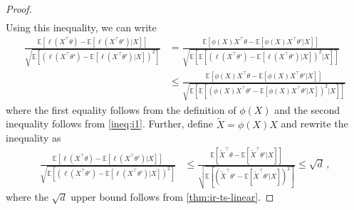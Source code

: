 \documentclass[letter, 12pt]{report}
\newcommand{\E}{\mathbb E}
\newcommand{\1}{\mathbf{1}}
\theoremstyle{plain}
\theoremstyle{definition}
\theoremstyle{remark}
\begin{document}
\begin{proof}
\begin{align}
    \end{align}
    Using this inequality, we can write
    \begin{align*}
        \frac{
            \E\left[
                \ell(X^\top \theta) - \E[\ell(X^\top \theta')|X]
                \right]
        }{
            \sqrt{
                \E\left[
                    \left(\ell(X^\top \theta') - \E[\ell(X^\top \theta')|X]\right)^2
                    \right]
            }
        }
         & =
        \frac{
            \E\left[
                \phi(X)X^\top \theta - \E[\phi(X)X^\top \theta'|X]
                \right]
        }{
            \sqrt{
                \E\left[
                    \E\left[
                        \left(\ell(X^\top \theta') - \E[\ell(X^\top \theta')|X]\right)^2
                        |X
                        \right]
                    \right]
            }
        }
        \\
         & \leq
        \frac{
            \E\left[
                \phi(X)X^\top \theta - \E[\phi(X)X^\top \theta'|X]
                \right]
        }{
            \sqrt{
                \E\left[
                    \E\left[
                        \left(\phi(X)X^\top \theta' -
                        \E[\phi(X)X^\top \theta'|X]\right)^2
                        |X
                        \right]
                    \right]
            }
        }
    \end{align*}
    where the first equality follows from the
    definition of $\phi(X)$ and the second inequality follows from \ref{ineq:i1}.
    Further, define $\tilde{X} = \phi(X)X$ and
    rewrite the inequality as
    \begin{align*}
        \frac{
            \E\left[
                \ell(X^\top \theta) - \E[\ell(X^\top \theta')|X]
                \right]
        }{
            \sqrt{
                \E\left[
                    \left(\ell(X^\top \theta') - \E[\ell(X^\top \theta')|X]\right)^2
                    \right]
            }
        }
         & \leq
        \frac{
            \E\left[
                \tilde{X}^\top \theta - \E[\tilde{X}^\top \theta'|X]
                \right]
        }{
            \sqrt{
                \E\left[
                    \left(\tilde{X}^\top \theta' -
                    \E[\tilde{X}^\top \theta'|X]\right)^2
                    \right]
            }
        }
        \leq
        \sqrt{d}\,,
    \end{align*}
    where the $\sqrt{d}$ upper bound follows from \cref{thm:ir-ts-linear}.
\end{proof}
\end{document}

